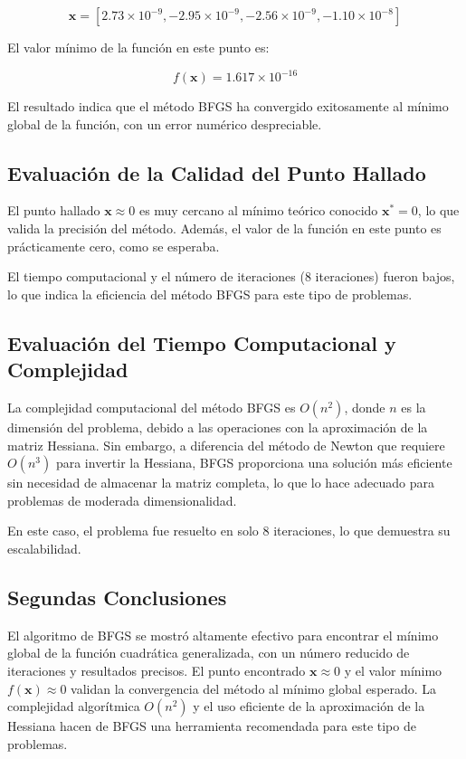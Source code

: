 \documentclass{article}
\begin{document}
	\[
	\mathbf{x} = [2.73 \times 10^{-9}, -2.95 \times 10^{-9}, -2.56 \times 10^{-9}, -1.10 \times 10^{-8}]
	\]
	
	El valor mínimo de la función en este punto es:
	
	\[
	f(\mathbf{x}) = 1.617 \times 10^{-16}
	\]
	
	El resultado indica que el método BFGS ha convergido exitosamente al mínimo global de la función, con un error numérico despreciable.
	
	
	\subsection{Evaluación de la Calidad del Punto Hallado}
	
	El punto hallado \(\mathbf{x} \approx 0\) es muy cercano al mínimo teórico conocido \(\mathbf{x}^* = 0\), lo que valida la precisión del método. Además, el valor de la función en este punto es prácticamente cero, como se esperaba. 
	
	El tiempo computacional y el número de iteraciones (8 iteraciones) fueron bajos, lo que indica la eficiencia del método BFGS para este tipo de problemas.
	
	\subsection{Evaluación del Tiempo Computacional y Complejidad}
	
	La complejidad computacional del método BFGS es \(O(n^2)\), donde \(n\) es la dimensión del problema, debido a las operaciones con la aproximación de la matriz Hessiana. Sin embargo, a diferencia del método de Newton que requiere \(O(n^3)\) para invertir la Hessiana, BFGS proporciona una solución más eficiente sin necesidad de almacenar la matriz completa, lo que lo hace adecuado para problemas de moderada dimensionalidad.
	
	En este caso, el problema fue resuelto en solo 8 iteraciones, lo que demuestra su escalabilidad.
	
	\subsection{Segundas Conclusiones}
	
	El algoritmo de BFGS se mostró altamente efectivo para encontrar el mínimo global de la función cuadrática generalizada, con un número reducido de iteraciones y resultados precisos. El punto encontrado \(\mathbf{x} \approx 0\) y el valor mínimo \(f(\mathbf{x}) \approx 0\) validan la convergencia del método al mínimo global esperado. La complejidad algorítmica \(O(n^2)\) y el uso eficiente de la aproximación de la Hessiana hacen de BFGS una herramienta recomendada para este tipo de problemas.
	
\end{document}
